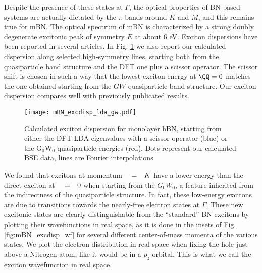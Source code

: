 Despite the presence of these states at $\Gamma$, the optical properties of BN-based systems are actually dictated by the $\pi$ bands around $K$ and $M$, and this remains true for mBN.
The optical spectrum of mBN is characterized by a strong doubly degenerate excitonic peak of symmetry $E$ at about $6$ eV. Exciton dispersions have been reported in several articles.\cite{cudazzo2016exciton,koskelo2017excitons,sponza2018direct} In Fig. \ref{fig:mBN_excdisp_lda_gw} we also report our calculated dispersion along selected high-symmetry lines, starting both from the quasiparticle band structure and the DFT one plus a scissor operator. The scissor shift is chosen in such a way that the lowest exciton energy at $\QQ = 0$ matches the one obtained starting from the $GW$ quasiparticle band structure. Our exciton dispersion compares well with previously publicated results.\cite{koskelo2017excitons,sponza2018direct}

\begin{figure}[h!tb]
	\vspace{0.2cm}
	\setcapindent{2em}
	\centering
	\texttt{[image: mBN\_excdisp\_lda\_gw.pdf]}
	\caption{Calculated exciton dispersion for monolayer hBN, starting from either the DFT-LDA eigenvalues with a scissor operator (blue) or the G$_0$W$_0$ quasiparticle energies (red). Dots represent our calculated BSE data, lines are Fourier interpolations}
	\label{fig:mBN_excdisp_lda_gw}
\end{figure}
We found that excitons at momentum $\qq=K$ have a lower energy than the direct exciton at $\qq=0$ when starting from the $G_0W_0$, a feature inherited from the indirectness of the quasiparticle structure. In fact, these low-energy excitons are due to transitions towards the nearly-free electron states at $\Gamma$.
These new excitonic states are clearly distinguishable from the ``standard'' BN excitons by plotting their wavefunctions in real space, as it is done in the insets of Fig. \ref{fig:mBN_excdisp_wf} for several different center-of-mass momenta of the various states. We plot the electron distribution in real space when fixing the hole just above a Nitrogen atom, like it would be in a $p_z$ orbital. This is what we call the exciton wavefunction in real space.

